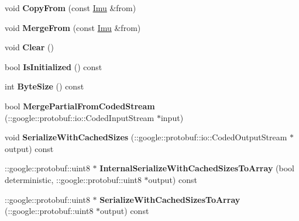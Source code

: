 \begin{DoxyCompactItemize}
\item 
\mbox{\label{class_i_m_u_1_1_imu_a9d61838fa598c8cb957aeffd42d46294}} 
void {\bfseries Copy\+From} (const \hyperlink{class_i_m_u_1_1_imu}{Imu} \&from)
\item 
\mbox{\label{class_i_m_u_1_1_imu_a6c1959848067ac88373a09d495d8faa5}} 
void {\bfseries Merge\+From} (const \hyperlink{class_i_m_u_1_1_imu}{Imu} \&from)
\item 
\mbox{\label{class_i_m_u_1_1_imu_a2e203948917f7b12d87720d46242f944}} 
void {\bfseries Clear} ()
\item 
\mbox{\label{class_i_m_u_1_1_imu_a361f2bf65e0950146129d0ca82586a1a}} 
bool {\bfseries Is\+Initialized} () const
\item 
\mbox{\label{class_i_m_u_1_1_imu_aa5d34198102bbd8b01703745aa825ad6}} 
int {\bfseries Byte\+Size} () const
\item 
\mbox{\label{class_i_m_u_1_1_imu_af473f9fdb2554b10f5ac512f25cb8331}} 
bool {\bfseries Merge\+Partial\+From\+Coded\+Stream} (\+::google\+::protobuf\+::io\+::\+Coded\+Input\+Stream $\ast$input)
\item 
\mbox{\label{class_i_m_u_1_1_imu_a5fbdff3154fd4453c4d1395ed0fd1223}} 
void {\bfseries Serialize\+With\+Cached\+Sizes} (\+::google\+::protobuf\+::io\+::\+Coded\+Output\+Stream $\ast$output) const
\item 
\mbox{\label{class_i_m_u_1_1_imu_a3932979ab08a12748b293951a4413e02}} 
\+::google\+::protobuf\+::uint8 $\ast$ {\bfseries Internal\+Serialize\+With\+Cached\+Sizes\+To\+Array} (bool deterministic, \+::google\+::protobuf\+::uint8 $\ast$output) const
\item 
\mbox{\label{class_i_m_u_1_1_imu_a8a6ef188e3066723ac91ef628f55a9ad}} 
\+::google\+::protobuf\+::uint8 $\ast$ {\bfseries Serialize\+With\+Cached\+Sizes\+To\+Array} (\+::google\+::protobuf\+::uint8 $\ast$output) const
\item 
\mbox{\label{class_i_m_u_1_1_imu_ae3609567576fffc73aafe6388e1231be}} 

\end{DoxyCompactItemize}
